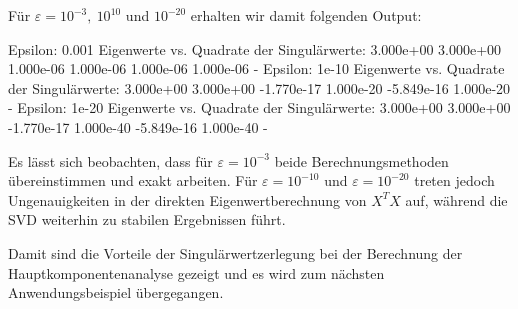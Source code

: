 Für \(\varepsilon=10^{-3},\ 10^{10}\) und \(10^{-20}\) erhalten wir damit folgenden Output: 
\begin{outputcode}
    Epsilon: 0.001
    Eigenwerte vs. Quadrate der Singulärwerte:
    3.000e+00        3.000e+00
    1.000e-06        1.000e-06
    1.000e-06        1.000e-06
    -
    Epsilon: 1e-10
    Eigenwerte vs. Quadrate der Singulärwerte:
    3.000e+00        3.000e+00
    -1.770e-17       1.000e-20
    -5.849e-16       1.000e-20
    -
    Epsilon: 1e-20
    Eigenwerte vs. Quadrate der Singulärwerte:
    3.000e+00        3.000e+00
    -1.770e-17       1.000e-40
    -5.849e-16       1.000e-40
    -
\end{outputcode}
Es lässt sich beobachten, dass für \(\varepsilon = 10^{-3}\) beide Berechnungsmethoden übereinstimmen und exakt arbeiten. 
Für \(\varepsilon=10^{-10}\) und \(\varepsilon = 10^{-20}\) treten jedoch Ungenauigkeiten in der direkten Eigenwertberechnung von \(X^{T}X\) auf, während die SVD weiterhin zu stabilen Ergebnissen führt.

Damit sind die Vorteile der Singulärwertzerlegung bei der Berechnung der Hauptkomponentenanalyse gezeigt und es wird zum nächsten Anwendungsbeispiel übergegangen.